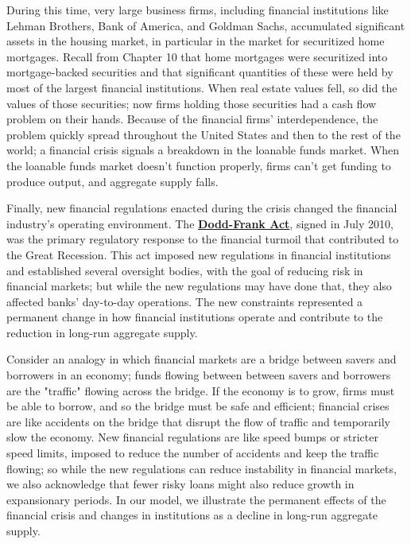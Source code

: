 \documentclass[11pt]{article} %
\begin{document}
During this time, very large business firms, including financial institutions like Lehman Brothers, Bank of America, and Goldman Sachs, accumulated significant assets in the housing market, in particular in the market for securitized home mortgages. Recall from Chapter 10 that home mortgages were securitized into mortgage-backed securities and that significant quantities of these were held by most of the largest financial institutions. When real estate values fell, so did the values of those securities; now firms holding those securities had a cash flow problem on their hands. Because of the financial firms' interdependence, the problem quickly spread throughout the United States and then to the rest of the world; a financial crisis signals a breakdown in the loanable funds market. When the loanable funds market doesn't function properly, firms can't get funding to produce output, and aggregate supply falls.

Finally, new financial regulations enacted during the crisis changed the financial industry's operating environment. The \textbf{\underline{Dodd-Frank Act}}, signed in July 2010, was the primary regulatory response to the financial turmoil that contributed to the Great Recession. This act imposed new regulations in financial institutions and established several oversight bodies, with the goal of reducing risk in financial markets; but while the new regulations may have done that, they also affected banks' day-to-day operations. The new constraints represented a permanent change in how financial institutions operate and contribute to the reduction in long-run aggregate supply.

Consider an analogy in which financial markets are a bridge between savers and borrowers in an economy; funds flowing between between savers and borrowers are the "traffic" flowing across the bridge. If the economy is to grow, firms must be able to borrow, and so the bridge must be safe and efficient; financial crises are like accidents on the bridge that disrupt the flow of traffic and temporarily slow the economy. New financial regulations are like speed bumps or stricter speed limits, imposed to reduce the number of accidents and keep the traffic flowing; so while the new regulations can reduce instability in financial markets, we also acknowledge that fewer risky loans might also reduce growth in expansionary periods. In our model, we illustrate the permanent effects of the financial crisis and changes in institutions as a decline in long-run aggregate supply.
\end{document}
